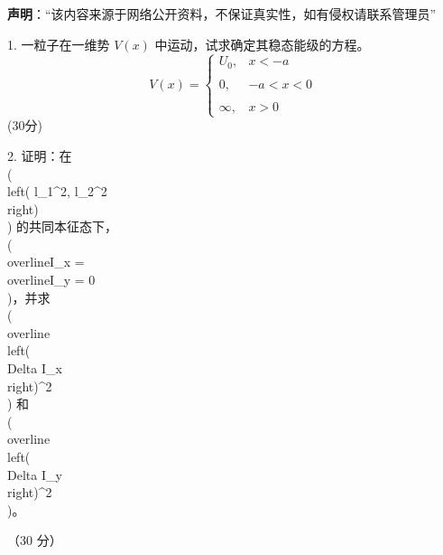 
\textbf{声明}：“该内容来源于网络公开资料，不保证真实性，如有侵权请联系管理员”

1. 一粒子在一维势 \( V(x) \) 中运动，试求确定其稳态能级的方程。
$$V(x) = \begin{cases} U_0, & x < -a \\\\0, & -a < x < 0 \\\\\infty, & x > 0 \end{cases}~$$
(30分)

2. 证明：在 \\(\\left( l_1^2, l_2^2 \\right)\\) 的共同本征态下， \\(\\overline{I}_x = \\overline{I}_y = 0\\)，并求 \\(\\overline{\\left( \\Delta I_x \\right)^2}\\) 和 \\(\\overline{\\left( \\Delta I_y \\right)^2}\\)。

（30 分）

